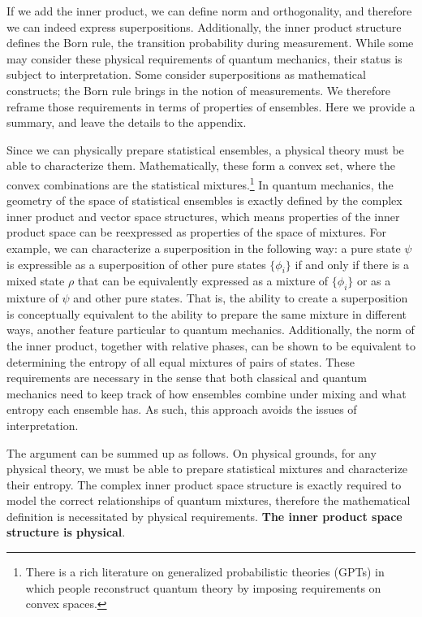 \documentclass[10pt,twocolumn, nofootinbib]{revtex4-2}
\begin{document}
If we add the inner product, we can define norm and orthogonality, and therefore we can indeed express superpositions. Additionally, the inner product structure defines the Born rule, the transition probability during measurement. While some may consider these physical requirements of quantum mechanics, their status is subject to interpretation.\cite{albert_quantum_1994, wallace_everett_2013, howard_complementarity_2021, ghirardi_unified_1986} Some consider superpositions as mathematical constructs; the Born rule brings in the notion of measurements. We therefore reframe those requirements in terms of properties of ensembles. Here we provide a summary, and leave the details to the appendix.

Since we can physically prepare statistical ensembles, a physical theory must be able to characterize them. Mathematically, these form a convex set, where the convex combinations are the statistical mixtures.\footnote{There is a rich literature on generalized probabilistic theories (GPTs) in which people reconstruct quantum theory by imposing requirements on convex spaces.\cite{gpt_overview_2021}} In quantum mechanics, the geometry of the space of statistical ensembles is exactly defined by the complex inner product and vector space structures, which means properties of the inner product space can be reexpressed as properties of the space of mixtures. For example, we can characterize a superposition in the following way: a pure state $\psi$ is expressible as a superposition of other pure states $\{\phi_i\}$ if and only if there is a mixed state $\rho$ that can be equivalently expressed as a mixture of $\{\phi_i\}$ or as a mixture of $\psi$ and other pure states. That is, the ability to create a superposition is conceptually equivalent to the ability to prepare the same mixture in different ways, another feature particular to quantum mechanics. Additionally, the norm of the inner product, together with relative phases, can be shown to be equivalent to determining the entropy of all equal mixtures of pairs of states. These requirements are necessary in the sense that both classical and quantum mechanics need to keep track of how ensembles combine under mixing and what entropy each ensemble has. As such, this approach avoids the issues of interpretation.

The argument can be summed up as follows. On physical grounds, for any physical theory, we must be able to prepare statistical mixtures and characterize their entropy. The complex inner product space structure is exactly required to model the correct relationships of quantum mixtures, therefore the mathematical definition is necessitated by physical requirements. \textbf{The inner product space structure is physical}.
\end{document}
